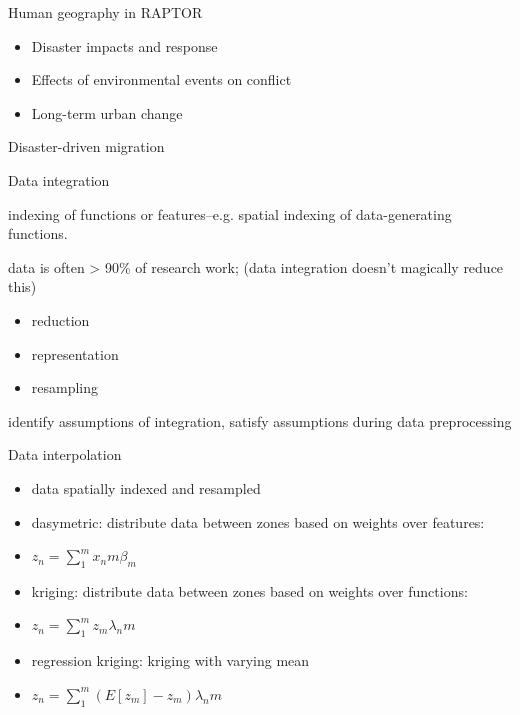 \documentclass{beamer}
\begin{document}
\begin{frame}Human geography at CERL}
\begin{itemize}
\item Population simulation \& {\bf interpolation}
\item {\bf Statistical hypothesis testing}
\item {\bf Data integration}
\item GIS
\end{itemize}
\end{frame}


\begin{frame}{Human geography in RAPTOR}
  \begin{itemize}
  \item Disaster impacts and response
  \item Effects of environmental events on conflict
  \item Long-term urban change
  \end{itemize}
\end{frame}


\begin{frame}{Disaster-driven migration}
\end{frame}


\begin{frame}{Data integration}
  \begin{definition}
    indexing of functions or features--e.g. spatial indexing of data-generating functions.
  \end{definition}
  data is often > 90\% of research work; (data integration doesn't magically reduce this)
  \begin{itemize}
  \item reduction
  \item representation
  \item resampling
  \end{itemize}
  identify assumptions of integration, satisfy assumptions during data preprocessing
\end{frame}


\begin{frame}{Data interpolation}
  \begin{itemize}
  \item data spatially indexed and resampled
  \item dasymetric: distribute data between zones based on weights over features:
  \item $z_n = \sum_1^m x_nm \beta_m$
  \item kriging: distribute data between zones based on weights over functions:
  \item $z_n = \sum_1^m z_m \lambda_nm$
  \item regression kriging: kriging with varying mean
  \item $z_n = \sum_1^m (E[z_m]-z_m) \lambda_nm$
  \end{itemize}
\end{frame}
\end{document}
